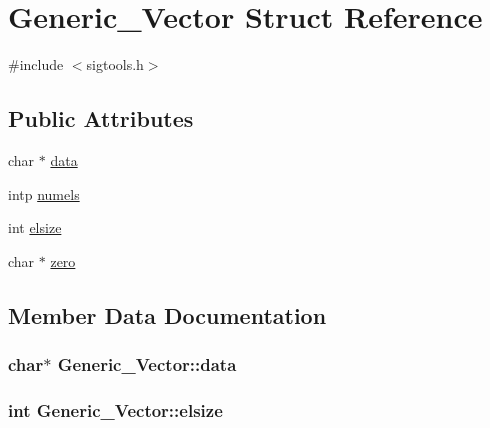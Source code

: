 \hypertarget{structGeneric__Vector}{}\section{Generic\+\_\+\+Vector Struct Reference}
\label{structGeneric__Vector}


{\ttfamily \#include $<$sigtools.\+h$>$}

\subsection*{Public Attributes}
\begin{DoxyCompactItemize}
\item 
char $\ast$ \hyperlink{structGeneric__Vector_ad9d160e4a6fa9a284e3c44709837e6bb}{data}
\item 
intp \hyperlink{structGeneric__Vector_a3f97134a1e97fed053d3924fb05cf8fa}{numels}
\item 
int \hyperlink{structGeneric__Vector_a03587cec574e99857fd6c985b75274f4}{elsize}
\item 
char $\ast$ \hyperlink{structGeneric__Vector_acc1f8b354014503bbf0b66b59bb2c43a}{zero}
\end{DoxyCompactItemize}


\subsection{Member Data Documentation}
\hypertarget{structGeneric__Vector_ad9d160e4a6fa9a284e3c44709837e6bb}{}
\subsubsection[{data}]{\setlength{\rightskip}{0pt plus 5cm}char$\ast$ Generic\+\_\+\+Vector\+::data}\label{structGeneric__Vector_ad9d160e4a6fa9a284e3c44709837e6bb}
\hypertarget{structGeneric__Vector_a03587cec574e99857fd6c985b75274f4}{}
\subsubsection[{elsize}]{\setlength{\rightskip}{0pt plus 5cm}int Generic\+\_\+\+Vector\+::elsize}\label{structGeneric__Vector_a03587cec574e99857fd6c985b75274f4}
\hypertarget{structGeneric__Vector_a3f97134a1e97fed053d3924fb05cf8fa}{}
